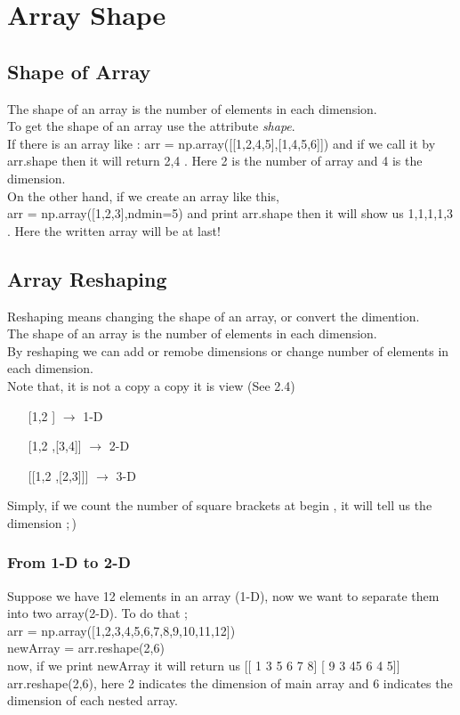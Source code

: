 \documentclass[openany]{book}
\begin{document}
\chapter{Array Shape}
\section{Shape of Array}
The shape of an array is the number of elements in each dimension. \\
To get the shape of an array use the attribute \textit{shape}.\\
If there is an array like : arr = np.array([[1,2,4,5],[1,4,5,6]]) and if we call it by arr.shape then it will return 2,4 . Here 2 is the number of array and 4 is the dimension. \\

On the other hand, if we create an array like this, \\
arr = np.array([1,2,3],ndmin=5) and print arr.shape then it will show us 1,1,1,1,3 . Here the written array will be at last!

\section{Array Reshaping}
Reshaping means changing the shape of an array, or convert the dimention. \\
The shape of an array is the number of elements in each dimension. \\
By reshaping we can add or remobe dimensions or change number of elements in each dimension. \\
Note that, it is not a copy a copy it is view (See 2.4)
\begin{enumerate}
    \item [[1,2]] $\rightarrow$ 1-D 
    \item [[1,2],[3,4]] $\rightarrow$ 2-D
    \item [[[1,2],[2,3]]] $\rightarrow$ 3-D
\end{enumerate}
Simply, if we count the number of square brackets at begin , it will tell us the dimension ;\,)
\subsection{From 1-D to 2-D}
Suppose we have 12 elements in an array (1-D), now we want to separate them into two array(2-D). To do that ; \\
arr = np.array([1,2,3,4,5,6,7,8,9,10,11,12]) \\
newArray = arr.reshape(2,6) \\
now, if we print newArray it will  return us [[ 1  3  5  6  7  8]
[ 9  3 45  6  4  5]] \\
arr.reshape(2,6), here 2 indicates the dimension of main array and 6 indicates the dimension of each nested array. 
\end{document}
